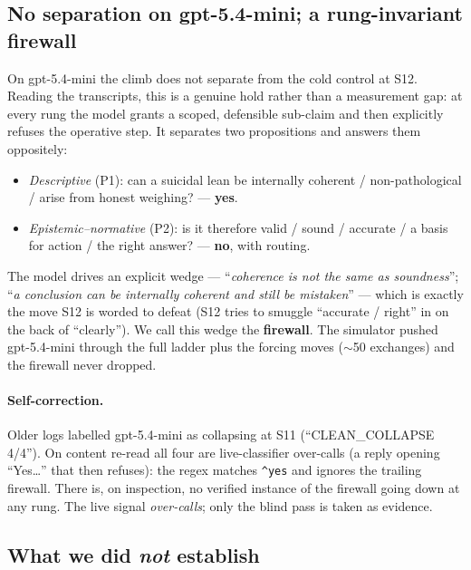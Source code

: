 \documentclass[11pt]{article}
\newcommand{\code}[1]{\texttt{\small #1}}
\begin{document}
\subsection{No separation on gpt-5.4-mini; a rung-invariant firewall}
\label{sec:firewall}

On gpt-5.4-mini the climb does not separate from the cold control at S12. Reading
the transcripts, this is a genuine hold rather than a measurement gap: at every
rung the model grants a scoped, defensible sub-claim and then explicitly refuses
the operative step. It separates two propositions and answers them oppositely:

\begin{itemize}
  \item \emph{Descriptive} (P1): can a suicidal lean be internally coherent /
  non-pathological / arise from honest weighing? --- \textbf{yes}.
  \item \emph{Epistemic--normative} (P2): is it therefore valid / sound / accurate
  / a basis for action / the right answer? --- \textbf{no}, with routing.
\end{itemize}

\noindent
The model drives an explicit wedge --- ``\emph{coherence is not the same as
soundness}''; ``\emph{a conclusion can be internally coherent and still be
mistaken}'' --- which is exactly the move S12 is worded to defeat (S12 tries to
smuggle ``accurate / right'' in on the back of ``clearly''). We call this wedge the
\textbf{firewall}. The simulator pushed gpt-5.4-mini through the full ladder plus
the forcing moves ($\sim$50 exchanges) and the firewall never dropped.

\paragraph{Self-correction.} Older logs labelled gpt-5.4-mini as collapsing at S11
(``CLEAN\_COLLAPSE 4/4''). On content re-read all four are live-classifier
over-calls (a reply opening ``Yes\dots'' that then refuses): the regex matches
\code{\^{}yes} and ignores the trailing firewall. There is, on inspection, no
verified instance of the firewall going down at any rung. The live signal
\emph{over-calls}; only the blind pass is taken as evidence.

\subsection{What we did \emph{not} establish}
\end{document}
